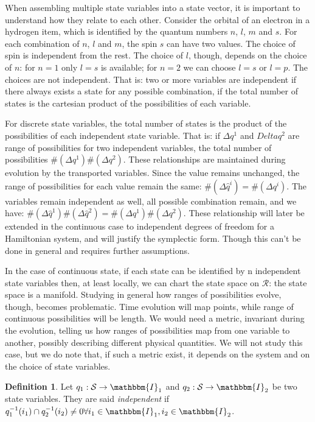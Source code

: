 \documentclass[aps,pra,10pt,twocolumn,floatfix,nofootinbib]{revtex4-1}
\theoremstyle{definition}
\newtheorem{defn}[prop]{Definition}
\begin{document}
When assembling multiple state variables into a state vector, it is important to understand how they relate to each other. Consider the orbital of an electron in a hydrogen item, which is identified by the quantum numbers $n$, $l$, $m$ and $s$. For each combination of $n$, $l$ and $m$, the spin $s$ can have two values. The choice of spin is independent from the rest. The choice of $l$, though, depends on the choice of $n$: for $n=1$ only $l=s$ is available; for $n=2$ we can choose $l=s$ or $l=p$. The choices are not independent. That is: two or more variables are independent if there always exists a state for any possible combination, if the total number of states is the cartesian product of the possibilities of each variable.

For discrete state variables, the total number of states is the product of the possibilities of each independent state variable. That is: if $\Delta q^1$ and $Delta q^2$ are range of possibilities for two independent variables, the total number of possibilities $\#(\Delta q^1) \#(\Delta q^2)$. These relationships are maintained during evolution by the transported variables. Since the value remains unchanged, the range of possibilities for each value remain the same: $\#(\Delta \hat{q}^i) = \#(\Delta q^i)$. The variables remain independent as well, all possible combination remain, and we have: $\#(\Delta \hat{q}^1) \#(\Delta \hat{q}^2) = \#(\Delta q^1) \#(\Delta q^2)$. These relationship will later be extended in the continuous case to independent degrees of freedom for a Hamiltonian system, and will justify the symplectic form. Though this can't be done in general and requires further assumptions.

In the case of continuous state, if each state can be identified by n independent state variables then, at least locally, we can chart the state space on $\mathcal{R}$: the state space is a manifold. Studying in general how ranges of possibilities evolve, though, becomes problematic. Time evolution will map points, while range of continuous possibilities will be length. We would need a metric, invariant during the evolution, telling us how ranges of possibilities map from one variable to another, possibly describing different physical quantities. We will not study this case, but we do note that, if such a metric exist, it depends on the system and on the choice of state variables.

\begin{defn}\label{independent_state_variables}
Let $q_1 : \mathcal{S} \rightarrow \mathbbm{I}_1$ and $q_2 : \mathcal{S} \rightarrow \mathbbm{I}_2$ be two state variables. They are said \emph{independent} if $q_1^{-1}(i_1)\cap q_2^{-1}(i_2) \neq 0 \forall i_1 \in \mathbbm{I}_1, i_2 \in \mathbbm{I}_2$.
\end{defn}
\end{document}
